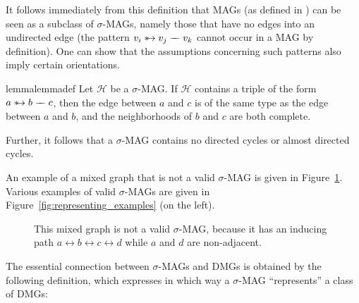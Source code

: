 \documentclass[accepted]{uai2025} %
\newcommand{\huh}{\mathrel{\leftrightarrow}}
\newcommand{\suh}{\mathrel{{\ast\mkern-11mu\to}}}
\newcommand{\tut}{\mathrel{{\relbar\mkern-9mu\relbar}}}
\begin{document}
It follows immediately from this definition that MAGs (as defined in \citep{richardson2002ancestral})
can be seen as a subclass of \( \sigma \)-MAGs, namely those that have no edges into an undirected edge (the pattern \( v_i \suh v_j \tut v_k\) cannot occur in a MAG by definition).
One can show that the assumptions concerning such patterns also imply certain orientations.

\begin{restatable}{lemma}{lemmadef} \label{oldDef}
Let \( \mathcal{H} \) be a \( \sigma \)-MAG. If \( \mathcal{H} \) contains a triple of the form \( a \suh b \tut c \), then the edge between \( a \) and \( c \) is of the same type as the edge between \( a \) and \( b \), and the neighborhoods of \( b \) and $c$ are both complete.
\end{restatable}

Further, it follows that a \( \sigma \)-MAG contains no directed cycles or almost directed cycles.

An example of a mixed graph that is not a valid $\sigma$-MAG is given in Figure~\ref{fig:nonmaximal_ancestral_graph}. Various examples of valid $\sigma$-MAGs are given in Figure~\ref{fig:representing_examples} (on the left).

\begin{figure}[t]\centering
  \caption{This mixed graph is not a valid $\sigma$-MAG, because it has an inducing path $a \huh b \huh  c \huh d$ while $a$ and $d$ are non-adjacent.\label{fig:nonmaximal_ancestral_graph}}
\end{figure}

The essential connection between $\sigma$-MAGs and DMGs is obtained by the following definition, which expresses in which way a $\sigma$-MAG ``represents'' a class of DMGs:
\end{document}
